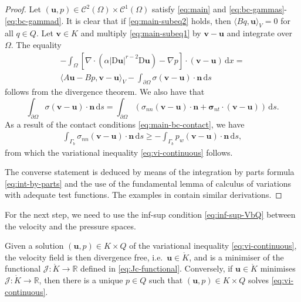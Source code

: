 \documentclass[onefignum,onetabnum]{siamart190516}
\newcommand{\RR}{\mathbb{R}}
\newcommand{\bn}{\boldsymbol{n}}
\newcommand{\bu}{\boldsymbol{u}}
\newcommand{\bv}{\boldsymbol{v}}
\newcommand{\bsigma}{\boldsymbol{\sigma}}
\newcommand{\bD}{\boldsymbol{\mathrm{D}}}
\newcommand{\dd}{\mathrm{d}}
\newcommand{\Ko}{\mathring{K}}
\newcommand{\Cc}{\mathcal{C}}
\newcommand{\bCc}{\boldsymbol{\mathcal{C}}}
\newcommand{\Jc}{\mathcal{J}}
\begin{document}
\begin{proof}
	Let $(\bu,p)\in \bCc^2(\Omega)\times \Cc^1(\Omega)$ satisfy \eqref{eq:main} and \eqref{eq:bc-gammas}-\eqref{eq:bc-gammad}. It is clear that if \eqref{eq:main-subeq2} holds, then $\langle Bq,\bu\rangle_V = 0$ for all $q\in Q$. Let $\bv\in K$ and multiply \eqref{eq:main-subeq1} by $\bv-\bu$ and integrate over $\Omega$. The equality 
	\begin{equation}\label{eq:int-by-parts}
		\begin{split}
			- \int_\Omega \left[ \nabla \cdot \left( \alpha |\bD\bu|^{r-2} \bD\bu \right) - \nabla p \right] \cdot (\bv - \bu)\,\dd x = \\
			\langle A\bu - Bp, \bv - \bu \rangle_V - \int_{\partial\Omega} \sigma (\bv - \bu) \cdot \bn\,\dd s
		\end{split}
	\end{equation}
	follows from the divergence theorem. We also have that 
	\[
		\int_{\partial\Omega} \sigma (\bv - \bu) \cdot \bn\,\dd s = \int_{\partial\Omega} \left( \sigma_{nn} (\bv - \bu) \cdot \bn + \bsigma_{nt} \cdot (\bv - \bu )\right)\,\dd s.
	\]
	As a result of the contact conditions \eqref{eq:main-bc-contact}, we have 
	\begin{align*}
		\int_{\Gamma_b} \sigma_{nn} (\bv - \bu)\cdot\bn\,\dd s \geq - \int_{\Gamma_b} p_w \left( \bv - \bu \right) \cdot \bn\,\dd s,
	\end{align*}
	from which the variational inequality \eqref{eq:vi-continuous} follows.
	
	The converse statement is deduced by means of the integration by parts formula \eqref{eq:int-by-parts} and the use of the fundamental lemma of calculus of variations with adequate test functions. The examples in \cite{glowinski1981,haslinger1996} contain similar derivations.
\end{proof}

For the next step, we need to use the inf-sup condition \eqref{eq:inf-sup-VbQ} between the velocity and the pressure spaces. 

\begin{lemma}\label{lemma:equivalence-vi-min}
	Given a solution $(\bu,p)\in K\times Q$ of the variational inequality \eqref{eq:vi-continuous}, the velocity field is then divergence free, i.e.~$\bu\in \Ko$, and is a minimiser of the functional $\Jc:\Ko\to \RR$ defined in \eqref{eq:Jc-functional}. Conversely, if $\bu\in \Ko$ minimises $\Jc:\Ko\to \RR$, then there is a unique $p\in Q$ such that $(\bu,p)\in K\times Q$ solves \eqref{eq:vi-continuous}.
\end{lemma}
\end{document}

